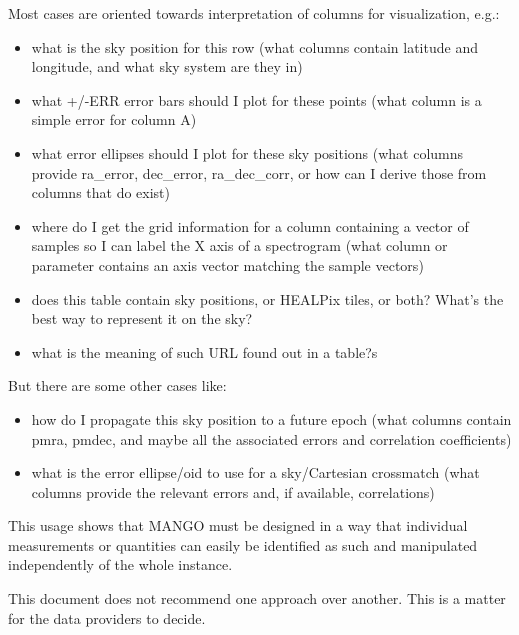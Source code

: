 Most cases are oriented towards interpretation of columns for visualization, e.g.:
\begin{itemize}[noitemsep,topsep=0pt,parsep=0pt,partopsep=0pt]
    \item what is the sky position for this row
    (what columns contain latitude and longitude, and what sky system are they in)

     \item what +/-ERR error bars should I plot for these points
    (what column is a simple error for column A)

    \item what error ellipses should I plot for these sky positions
    (what columns provide ra\_error, dec\_error, ra\_dec\_corr,
     or how can I derive those from columns that do exist)

    \item where do I get the grid information for a column containing
    a vector of samples so I can label the X axis of a spectrogram
    (what column or parameter contains an axis vector matching
     the sample vectors)

    \item does this table contain sky positions, or HEALPix tiles, or both?
    What's the best way to represent it on the sky?

    \item what is the meaning of such URL found out in a table?s
\end{itemize}

But there are some other cases like:
\begin{itemize}[noitemsep,topsep=0pt,parsep=0pt,partopsep=0pt]
    \item how do I propagate this sky position to a future epoch
    (what columns contain pmra, pmdec, and maybe all the
     associated errors and correlation coefficients)

    \item what is the error ellipse/oid to use for a sky/Cartesian crossmatch
    (what columns provide the relevant errors and, if available,
     correlations)
\end{itemize}

This usage shows that MANGO must be designed in a way that individual measurements or quantities
can easily be identified as such and manipulated independently of the whole instance.

This document does not recommend one approach over another.
This is a matter for the data providers to decide.

